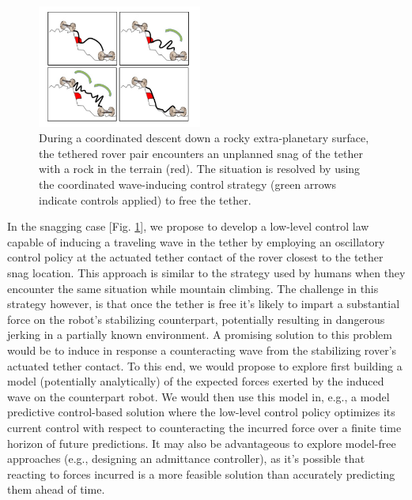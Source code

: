 \documentclass[12pt]{article}
\begin{document}
\begin{figure}
  \begin{center}
    \vspace{-0.4in}
    \includegraphics[width=0.48\textwidth, right]{tether_desnag.jpg}
  \end{center}
  \vspace{-0.4in}
  \caption{During a coordinated descent down a rocky extra-planetary surface, the tethered rover pair encounters an unplanned 
  snag of the tether with a rock in the terrain (red). The situation is resolved by using the coordinated wave-inducing control strategy (green arrows indicate controls applied) to free the tether.}
  \label{fig:tethersnag}
\end{figure}
In the snagging case [Fig. \ref{fig:tethersnag}], we propose to develop a low-level control law capable of inducing a 
traveling wave in the tether by employing 
an oscillatory control policy at the actuated tether contact of the rover closest to the tether snag location. This approach is 
similar to the strategy used by humans when they encounter the same situation while mountain climbing. 
The challenge in this strategy however, is that once the tether is free it's likely to impart a substantial 
force on the robot's stabilizing counterpart, potentially resulting in dangerous jerking in a partially known environment. 
A promising solution to this problem would be to induce in response a counteracting wave from the stabilizing rover's actuated tether 
contact. To this end, we would propose to explore first building a model (potentially analytically)
of the expected forces exerted by the induced wave on the counterpart robot. 
We would then use this model in, e.g., a model predictive control-based solution where 
the low-level control policy optimizes its current control with respect to counteracting the incurred force over 
a finite time horizon of future predictions. It may also be advantageous to explore model-free approaches 
(e.g., designing an admittance controller), as it's possible that reacting to forces incurred is a more feasible 
solution than accurately predicting them ahead of time. 
\end{document}
